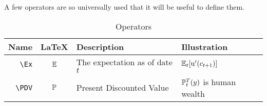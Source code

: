 
A few operators are so universally used that it will be useful to define them.

\begin{table}[h]
	\centering
	\begin{tabular}{||>{\ttfamily}rcll||}
		\hline
		 Name    & LaTeX         & Description & Illustration
  \\ \hline
     \verb|\Ex|        & $\operatorname{\mathbb{E}}$       & The expectation as of date $t$ & $\operatorname{\mathbb{E}}_{t}[{\mathrm{u}}^{\prime}(c_{t+1})]$
\\   \verb|\PDV|        & $\mathbb{P}$       & Present Discounted Value & $\mathbb{P}_{t}^{T}(y)$ is human wealth
  \\	\hline
	\end{tabular}
	\caption{Operators}
	\label{table:Operators}
\end{table}



